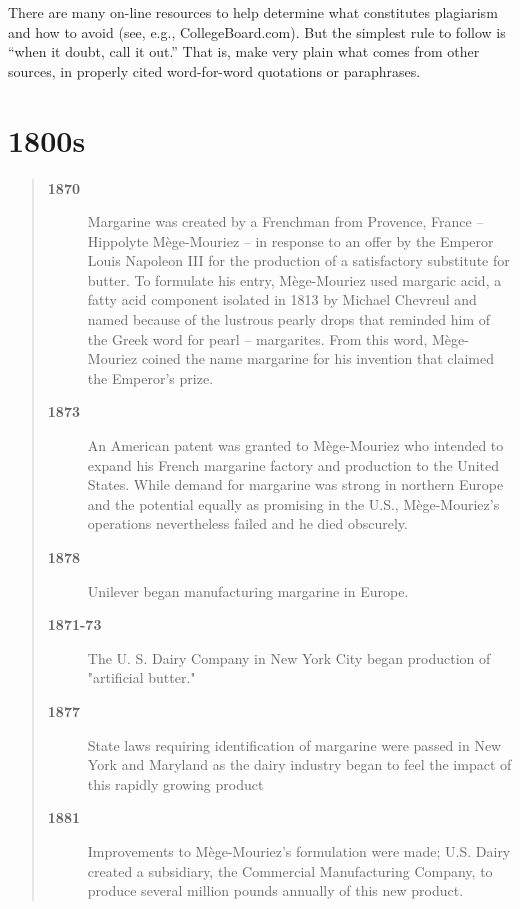 \documentclass[mnsc,blindrev]{informs3} %
\begin{document}
There are many on-line resources to help determine what constitutes
plagiarism and how to avoid (see, e.g., CollegeBoard.com).  But the
simplest rule to follow is ``when it doubt, call it out.''  That is,
make very plain what comes from other sources, in properly cited
word-for-word quotations or paraphrases.

\section{1800s}

\begin{quotation}

\begin{description}

\item[\bf 1870] Margarine was created by a Frenchman from Provence,
France -- Hippolyte M\`ege-Mouriez -- in response to an offer by
the Emperor Louis Napoleon III for the production of a satisfactory
substitute for butter. To formulate his entry, M\`ege-Mouriez used
margaric acid, a fatty acid component isolated in 1813 by Michael
Chevreul and named because of the lustrous pearly drops that reminded
him of the Greek word for pearl -- margarites. From this word,
M\`ege-Mouriez coined the name margarine for his invention that
claimed the Emperor's prize.

\item[\bf 1873] An American patent was granted to M\`ege-Mouriez who
intended to expand his French margarine factory and production to
the United States. While demand for margarine was strong in northern
Europe and the potential equally as promising in the U.S.,
M\`ege-Mouriez's operations nevertheless failed and he died obscurely.

\item[\bf 1878] Unilever began manufacturing margarine in Europe.

\item[\bf 1871-73] The U. S. Dairy Company in New York City began
production of "artificial butter."

\item[\bf 1877] State laws requiring identification of margarine were
passed in New York and Maryland as the dairy industry began to feel
the impact of this rapidly growing product

\item[\bf 1881] Improvements to M\`ege-Mouriez's formulation were made;
U.S. Dairy created a subsidiary, the Commercial Manufacturing Company,
to produce several million pounds annually of this new product.


\end{description}
\end{quotation}
\end{document}
